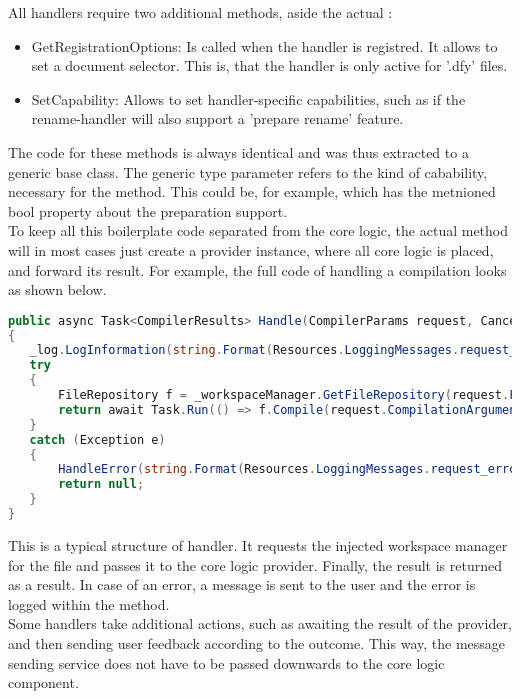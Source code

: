 All handlers require two additional methods, aside the actual :
\begin{itemize}
    \item GetRegistrationOptions: Is called when the handler is registred.
    It allows to set a document selector.
    This is, that the handler is only active for '.dfy' files.
    \item SetCapability: Allows to set handler-specific capabilities, such as if the rename-handler will also support a 'prepare rename' feature.
\end{itemize}
The code for these methods is always identical and was thus extracted to a generic base class.
The generic type parameter refers to the kind of cabability, necessary for the  method.
This could be, for example,  which has the metnioned bool property about the preparation support.\\

To keep all this boilerplate code separated from the core logic, the actual  method will in most cases just create a provider instance, where all core logic is placed, and forward its result.
For example, the full code of handling a compilation looks as shown below.

\begin{lstlisting}[language=csharp, caption={Handling Compilation}, captionpos=b, label={lst:handlecompilation}]
public async Task<CompilerResults> Handle(CompilerParams request, CancellationToken cancellationToken)
{
   _log.LogInformation(string.Format(Resources.LoggingMessages.request_handle, _method));
   try
   {
       FileRepository f = _workspaceManager.GetFileRepository(request.FileToCompile);
       return await Task.Run(() => f.Compile(request.CompilationArguments), cancellationToken);
   }
   catch (Exception e)
   {
       HandleError(string.Format(Resources.LoggingMessages.request_error, _method), e);
       return null;
   }
}
\end{lstlisting}

This is a typical structure of handler.
It requests the injected workspace manager for the file and passes it to the core logic provider.
Finally, the result is returned as a result.
In case of an error, a message is sent to the user and the error is logged within the  method.\\

Some handlers take additional actions, such as awaiting the result of the provider, and then sending user feedback according to the outcome.
This way, the message sending service does not have to be passed downwards to the core logic component.

